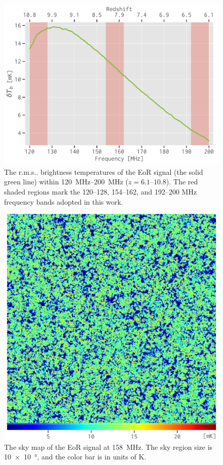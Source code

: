 \documentclass[twocolumn]{aastex62}
\makeatletter
\newcommand{\rms}{r.m.s\@ifnextchar.{}{.\@}}
\makeatother
\begin{document}
\begin{figure}
  \centering
  \includegraphics[width=\columnwidth]{eos2016-tbrms}
  \caption{\label{fig:eor-tbrms}%
    The \rms{} brightness temperatures of the EoR signal
    (the solid green line) within \SIrange{120}{200}{\MHz}
    ($z = \numrange{6.1}{10.8}$).
    The red shaded regions mark the \numrange{120}{128},
    \numrange{154}{162}, and \numrange{192}{200} \si{\MHz}
    frequency bands adopted in this work.
  }
\end{figure}

\begin{figure}
  \centering
  \includegraphics[width=\columnwidth]{21cm-f158}
  \caption{\label{fig:map-eor}%
    The sky map of the EoR signal at \SI{158}{\MHz}.
    The sky region size is \SI[product-units=repeat]{10 x 10}{\degree},
    and the color bar is in units of \si{\kelvin}.
  }
\end{figure}
\end{document}
